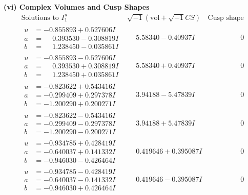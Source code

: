 \documentclass[1p]{elsarticle_modified}
\theoremstyle{definition}
\newcommand{\I}{\sqrt{-1}}
\begin{document}
\newpage\flushleft \textbf{(vi) Complex Volumes and Cusp Shapes}
$$\begin{array}{c|c|c}  
\text{Solutions to }I^u_{1}& \I (\text{vol} + \sqrt{-1}CS) & \text{Cusp shape}\\
 \hline 
\begin{aligned}
u &= -0.855893 + 0.527606 I \\
a &= \phantom{-}0.393530 - 0.308819 I \\
b &= \phantom{-}1.238450 - 0.035861 I\end{aligned}
 & \phantom{-}5.58340 - 0.40937 I & \phantom{-0.000000 } 0 \\ \hline\begin{aligned}
u &= -0.855893 - 0.527606 I \\
a &= \phantom{-}0.393530 + 0.308819 I \\
b &= \phantom{-}1.238450 + 0.035861 I\end{aligned}
 & \phantom{-}5.58340 + 0.40937 I & \phantom{-0.000000 } 0 \\ \hline\begin{aligned}
u &= -0.823622 + 0.543416 I \\
a &= -0.299409 + 0.297378 I \\
b &= -1.200290 + 0.200271 I\end{aligned}
 & \phantom{-}3.94188 - 5.47839 I & \phantom{-0.000000 } 0 \\ \hline\begin{aligned}
u &= -0.823622 - 0.543416 I \\
a &= -0.299409 - 0.297378 I \\
b &= -1.200290 - 0.200271 I\end{aligned}
 & \phantom{-}3.94188 + 5.47839 I & \phantom{-0.000000 } 0 \\ \hline\begin{aligned}
u &= -0.934785 + 0.428419 I \\
a &= -0.640037 + 0.141332 I \\
b &= -0.946030 - 0.426464 I\end{aligned}
 & \phantom{-}0.419646 + 0.395087 I & \phantom{-0.000000 } 0 \\ \hline\begin{aligned}
u &= -0.934785 - 0.428419 I \\
a &= -0.640037 - 0.141332 I \\
b &= -0.946030 + 0.426464 I\end{aligned}
 & \phantom{-}0.419646 - 0.395087 I & \phantom{-0.000000 } 0 \\ \hline\begin{aligned}

\end{aligned}
\end{array}$$
\end{document}
